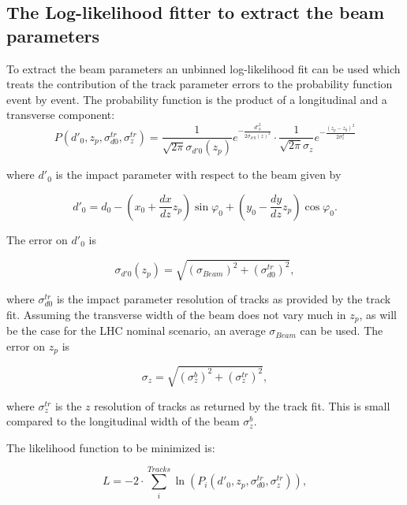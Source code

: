 \documentclass{cmspaper}
\begin{document}
\subsection{\label{sec:width}The Log-likelihood {fitter} to extract the beam parameters}


To extract the beam parameters an unbinned log-likelihood fit can be used which treats the contribution of the 
track parameter errors to the probability function event by event.  
The probability function is the product of a longitudinal and a transverse component:
\begin{equation}
P(d'_0,z_p,\sigma_{d0}^{tr},\sigma_z^{tr})=
\frac{1}{\sqrt{2\pi}\sigma_{d'0}(z_p)} e^{-\frac{d'^2_{0}}{2\sigma_{d'0}(z)^2}}
\cdot \frac{1}{\sqrt{2\pi}\sigma_z} e^{-\frac{(z_p-z_0)^2}{2\sigma_z^2}}
\end{equation}

\noindent where $d'_0$ is the impact parameter with respect to the beam given by 

\begin{equation}
\label{eq:dprime0}
d'_0=d_0-(x_0+\frac{dx}{dz}z_p)\sin\varphi_0+(y_0-\frac{dy}{dz}z_p)\cos\varphi_0 . 
\end{equation}

The error on $d'_0$ is 

\begin{equation}
\label{eq:sigmadprime0} 
\sigma_{d'0}(z_p)= \sqrt{ \left( \sigma_{Beam}\right)^2 +(\sigma_{d0}^{tr})^2}, 
\end{equation}

\noindent where $\sigma_{d0}^{tr}$ is the impact parameter resolution of tracks as provided by the track fit.
Assuming  the transverse width of the beam  does not vary much in $z_p$, as will be the  case for the LHC nominal scenario, an
average $\sigma_{Beam}$ can be used. The error on $z_p$ is

\begin{equation}
\sigma_z= \sqrt{(\sigma^{b}_z)^2 +(\sigma_z^{tr})^2},
\end{equation}

\noindent where $\sigma_z^{tr}$ is the $z$ resolution of tracks as returned by the track fit. This is small compared to the longitudinal width of the beam $\sigma^{b}_{z}$. 


The likelihood function to be minimized is:

\begin{equation}
L= 
-2\cdot \sum_{i}^{Tracks}  \ln\left( P_i(d'_0,z_p,\sigma_{d0}^{tr},\sigma_{z}^{tr})\right),
\label{eq:likelihood}
\end{equation}
\end{document}
